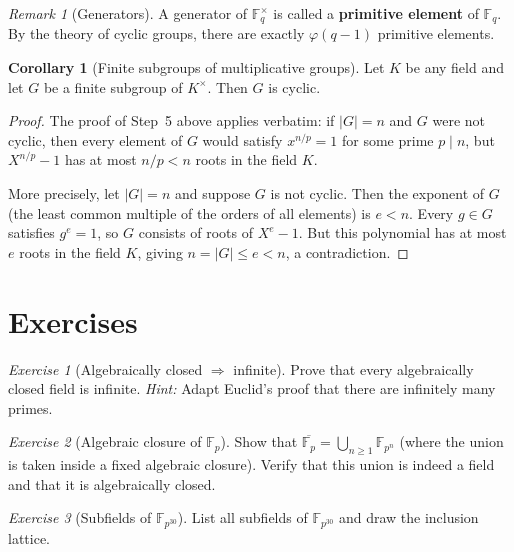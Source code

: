 \documentclass[12pt,a4paper,openany]{book}
\theoremstyle{definition}
\newtheorem{corollary}{Corollary}[chapter]
\theoremstyle{remark}
\newtheorem{remark}{Remark}[chapter]
\newtheorem{exercise}{Exercise}[chapter]
\newcommand{\F}{\mathbb{F}}
\begin{document}
\begin{remark}[Generators]
\label{rem:primitive-element-finite}
A generator of $\F_q^{\times}$ is called a \textbf{primitive element}
of $\F_q$. By the theory of cyclic groups, there are exactly
$\varphi(q-1)$ primitive elements.
\end{remark}

\begin{corollary}[Finite subgroups of multiplicative groups]
\label{cor:finite-subgroup-mult}
Let $K$ be any field and let $G$ be a finite subgroup of $K^{\times}$.
Then $G$ is cyclic.
\end{corollary}

\begin{proof}
The proof of Step~5 above applies verbatim: if $|G| = n$ and $G$ were
not cyclic, then every element of $G$ would satisfy $x^{n/p} = 1$ for
some prime $p \mid n$, but $X^{n/p} - 1$ has at most $n/p < n$ roots
in the field $K$.

More precisely, let $|G| = n$ and suppose $G$ is not cyclic. Then the
exponent of $G$ (the least common multiple of the orders of all
elements) is $e < n$. Every $g \in G$ satisfies $g^e = 1$, so $G$
consists of roots of $X^e - 1$. But this polynomial has at most $e$
roots in the field $K$, giving $n = |G| \le e < n$, a contradiction.
\end{proof}

\section{Exercises}
\label{sec:ch10-exercises}

\begin{exercise}[Algebraically closed $\Rightarrow$ infinite]
\label{exer:alg-closed-infinite}
Prove that every algebraically closed field is infinite.
\textit{Hint:} Adapt Euclid's proof that there are infinitely many
primes.
\end{exercise}

\begin{exercise}[Algebraic closure of $\F_p$]
\label{exer:alg-closure-Fp}
\index{algebraic closure!of $\F_p$}
Show that $\overline{\F_p} = \bigcup_{n \ge 1} \F_{p^n}$ (where the
union is taken inside a fixed algebraic closure). Verify that this
union is indeed a field and that it is algebraically closed.
\end{exercise}

\begin{exercise}[Subfields of $\F_{p^{30}}$]
\label{exer:subfields-Fp30}
List all subfields of $\F_{p^{30}}$ and draw the inclusion lattice.
\end{exercise}
\end{document}
